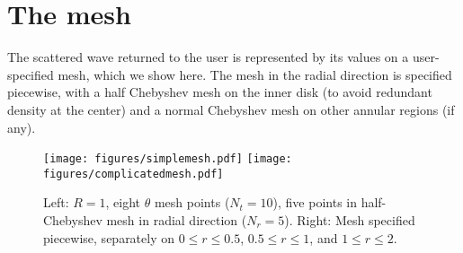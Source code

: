 \section{The mesh}
\label{sec-mesh}

The scattered wave returned to the user is represented by its
values on a user-specified mesh, which we show here.
The mesh in the radial direction is specified piecewise, with
a half Chebyshev mesh on the inner disk (to avoid redundant density
at the center) and a normal Chebyshev mesh on other annular regions
(if any). 

\begin{figure}[h]
\texttt{[image: figures/simplemesh.pdf]}
\texttt{[image: figures/complicatedmesh.pdf]}
\caption{Left: $R = 1$, eight $\theta$ mesh points ($N_t = 10$), 
               five points in half-Chebyshev mesh in radial 
               direction ($N_r = 5$).
         Right: Mesh specified piecewise, separately on
               $0 \le r \le 0.5$, $0.5 \le r \le 1$, and
               $1 \le r \le 2$.}
\end{figure}


